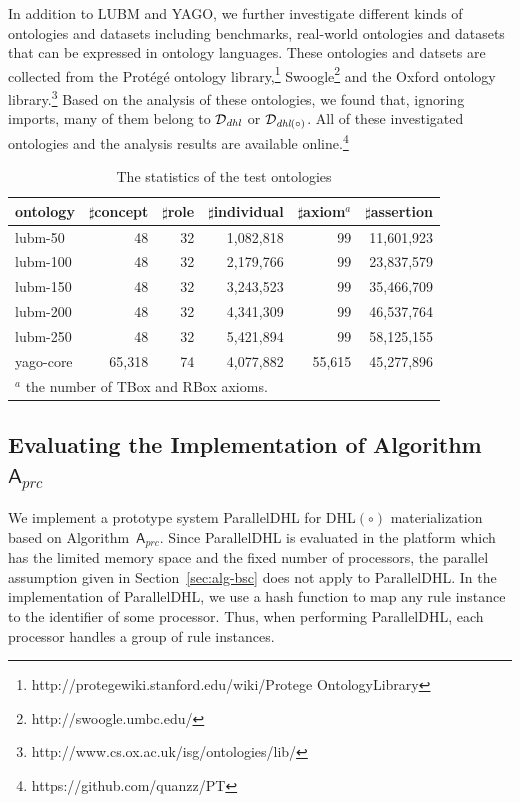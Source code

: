 In addition to LUBM and YAGO, we further investigate different kinds of ontologies and datasets
including benchmarks, real-world ontologies and datasets that can be
expressed in ontology languages.
These ontologies and datsets are collected from the Prot\'{e}g\'{e}
ontology
library,\footnote{http://protegewiki.stanford.edu/wiki/Protege\textunderscore
  Ontology\textunderscore Library}
Swoogle\footnote{http://swoogle.umbc.edu/} and the Oxford ontology library.\footnote{http://www.cs.ox.ac.uk/isg/ontologies/lib/}
Based on the analysis of these ontologies, we found that, ignoring imports, many of them
belong to $\mathcal{D}_{\textit{\text{dhl}}}$ or $\mathcal{D}_{\textit{\text{dhl}}(\circ)}$.
All of these investigated ontologies and the analysis results are available online.\footnote{https://github.com/quanzz/PT}

\begin{table}
\centering
\caption{The statistics of the test ontologies}
\begin{tabular}{|l|r|r|r|r|r|}
\hline
ontology&$\sharp$concept&$\sharp$role&$\sharp$individual&$\sharp$axiom$^{a}$&$\sharp$assertion\\
\hline
lubm-50&48&32&1,082,818&99&11,601,923\\
lubm-100&48&32&2,179,766&99&23,837,579\\
lubm-150&48&32&3,243,523&99&35,466,709\\
lubm-200&48&32&4,341,309&99&46,537,764\\
lubm-250&48&32&5,421,894&99&58,125,155\\
yago-core&65,318&74&4,077,882&55,615&45,277,896\\
\hline
\multicolumn{5}{l}{$^{a}$ \small the number of TBox and RBox axioms.}\\
\end{tabular}
\label{tab:onto}
\end{table}


\subsection{Evaluating the Implementation of Algorithm~$\mathsf{A}_{prc}$}

We implement a prototype system ParallelDHL for DHL$(\circ)$ materialization
based on Algorithm~$\mathsf{A}_{prc}$. Since ParallelDHL is evaluated in the
platform which has the limited memory space and the fixed number of processors,
the parallel assumption given in Section~\ref{sec:alg-bsc} does not apply to ParallelDHL.
In the implementation of ParallelDHL, we use a hash function to map any rule instance
to the identifier of some processor. Thus, when performing ParallelDHL,
each processor handles a group of rule instances.

